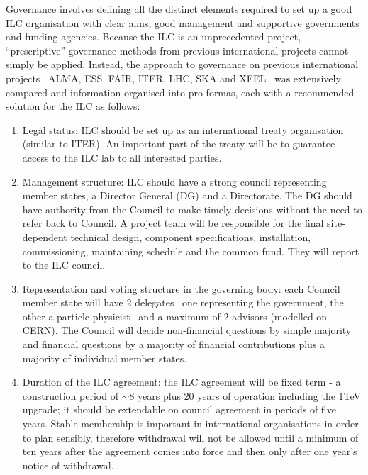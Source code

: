 Governance involves defining all the distinct elements required to set up a good ILC organisation with clear aims, good management and supportive governments and funding agencies. Because the ILC is an unprecedented project, ``prescriptive'' governance methods from previous international projects cannot simply be applied. Instead, the approach to governance on previous international projects \textemdash \, ALMA, ESS, FAIR, ITER, LHC, SKA and XFEL \textemdash \, was extensively compared and information organised into pro-formas, each with a recommended solution for the ILC as follows: \cite{ILC:PIPReport}

\begin{enumerate}

\item Legal status: ILC should be set up as an international treaty organisation (similar to ITER). An important part of the treaty will be to guarantee access to the ILC lab to all interested parties.

\item Management structure: ILC should have a strong council representing member states, a Director General (DG) and a Directorate. The DG should have authority from the Council to make timely decisions without the need to refer back to Council. A project team will be responsible for the final site-dependent technical design, component specifications, installation, commissioning, maintaining schedule and the common fund. They will report to the ILC council.

\item Representation and voting structure in the governing body: each Council member state will have 2 delegates  \textemdash \, one representing the government, the other a particle physicist \textemdash \, and a maximum of 2 advisors (modelled on CERN). The Council will decide non-financial questions by simple majority and financial questions by a majority of financial contributions plus a majority of individual member states.

\item Duration of the ILC agreement: the ILC agreement will be fixed term - a construction period of $\sim$8 years plus 20 years of operation including the 1TeV upgrade; it should be extendable on council agreement in periods of five years. Stable membership is important in international organisations in order to plan sensibly, therefore withdrawal will not be allowed until a minimum of ten years after the agreement comes into force and then only after one year's notice of withdrawal.


\end{enumerate}
